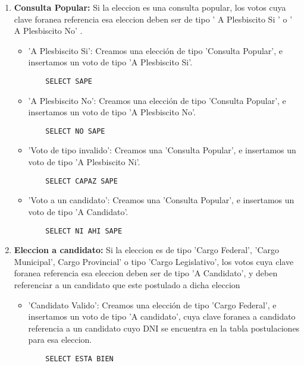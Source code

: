 \begin{enumerate}

\item \textbf{Consulta Popular:} Si la eleccion es una consulta popular, los votos cuya clave foranea
referencia esa eleccion deben ser de tipo ' A Plesbiscito Si ' o ' A Plesbiscito No' .

	\begin{itemize}
	\item 'A Plesbiscito Si': Creamos una elección de tipo 'Consulta Popular', e insertamos un voto
	de tipo 'A Plesbiscito Si'.
	\begin{lstlisting}
	SELECT SAPE
	\end{lstlisting}
	
	\item 'A Plesbiscito No': Creamos una elección de tipo 'Consulta Popular', e insertamos un voto
	de tipo 'A Plesbiscito No'.
	\begin{lstlisting}
	SELECT NO SAPE
	\end{lstlisting}
	\item 'Voto de tipo invalido': Creamos una 'Consulta Popular', e insertamos un voto
	de tipo 'A Plesbiscito Ni'.
	\begin{lstlisting}
	SELECT CAPAZ SAPE
	\end{lstlisting}
	
	\item 'Voto a un candidato': Creamos una 'Consulta Popular', e insertamos un voto
	de tipo 'A Candidato'.
	\begin{lstlisting}
	SELECT NI AHI SAPE
	\end{lstlisting}	
	
	\end{itemize}

\item \textbf{Eleccion a candidato:}  Si la eleccion es de tipo 'Cargo Federal', 'Cargo Municipal', Cargo Provincial' o tipo 'Cargo Legislativo', los votos cuya clave foranea referencia esa eleccion deben ser de tipo 'A Candidato', y deben referenciar a un candidato que este postulado a dicha eleccion

	\begin{itemize}
	\item 'Candidato Valido': Creamos una elección de tipo 'Cargo Federal', e insertamos un voto
	de tipo 'A candidato', cuya clave foranea a candidato referencia a un candidato cuyo DNI se encuentra en la tabla postulaciones para esa eleccion.
	\begin{lstlisting}
	SELECT ESTA BIEN
	\end{lstlisting}
	

\end{itemize}
\end{enumerate}
